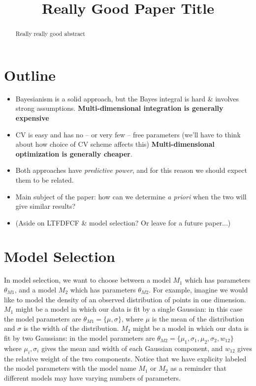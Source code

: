 \documentclass[12pt]{article}
\title{Really Good Paper Title}
\begin{document}
\maketitle

\begin{abstract}
  Really really good abstract
\end{abstract}

\section{Outline}
\begin{itemize}
\item Bayesianism is a solid approach, but the Bayes integral is hard \&
  involves strong assumptions. {\bf Multi-dimensional integration
    is generally expensive}
\item CV is easy and has no -- or very few -- free parameters (we'll have to
  think about how choice of CV scheme affects this)
  {\bf Multi-dimensional optimization is generally cheaper}.
\item Both approaches have {\it predictive power}, and for this reason we
  should expect them to be related.
\item Main subject of the paper: how can we determine {\it a priori} when the
  two will give similar results?
\item (Aside on LTFDFCF \& model selection?  Or leave for a future paper...)
\end{itemize}

\section{Model Selection}
In model selection, we want to choose between a model $M_1$ which has
parameters $\theta_{M1}$, and a model $M_2$ which has parameters $\theta_{M2}$.
For example, imagine we would like to model the density of an observed
distribution of points in one dimension.  
$M_1$ might be a model in which our data is fit by a single
Gaussian: in this case the model parameters are $\theta_{M1} = \{\mu, \sigma\}$,
where $\mu$ is the mean of the distribution and $\sigma$ is the width of the
distribution.  $M_2$ might be a model in which our data is fit by two
Gaussians: in the model parameters are
$\theta_{M2} = \{\mu_1,\sigma_1,\mu_2,\sigma_2,w_{12}\}$ where $\mu_i,\sigma_i$
gives the mean and width of each Gaussian component, and $w_{12}$ gives the
relative weight of the two components. Notice that we have explicity
labeled the model parameters with the model name $M_1$ or $M_2$ as a reminder
that different models may have varying numbers of parameters.
\end{document}
